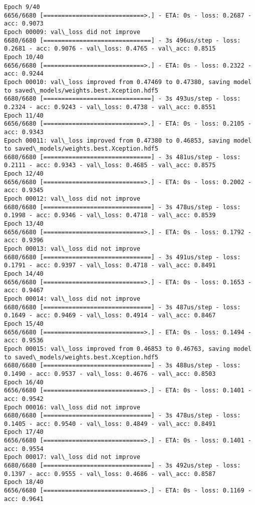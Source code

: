 \documentclass[11pt]{article}
\begin{document}
\begin{Verbatim}[commandchars=\\\{\}]
Epoch 9/40
6656/6680 [============================>.] - ETA: 0s - loss: 0.2687 - acc: 0.9073
Epoch 00009: val\_loss did not improve
6680/6680 [==============================] - 3s 496us/step - loss: 0.2681 - acc: 0.9076 - val\_loss: 0.4765 - val\_acc: 0.8515
Epoch 10/40
6656/6680 [============================>.] - ETA: 0s - loss: 0.2322 - acc: 0.9244
Epoch 00010: val\_loss improved from 0.47469 to 0.47380, saving model to saved\_models/weights.best.Xception.hdf5
6680/6680 [==============================] - 3s 493us/step - loss: 0.2324 - acc: 0.9243 - val\_loss: 0.4738 - val\_acc: 0.8551
Epoch 11/40
6656/6680 [============================>.] - ETA: 0s - loss: 0.2105 - acc: 0.9343
Epoch 00011: val\_loss improved from 0.47380 to 0.46853, saving model to saved\_models/weights.best.Xception.hdf5
6680/6680 [==============================] - 3s 481us/step - loss: 0.2111 - acc: 0.9343 - val\_loss: 0.4685 - val\_acc: 0.8575
Epoch 12/40
6656/6680 [============================>.] - ETA: 0s - loss: 0.2002 - acc: 0.9345
Epoch 00012: val\_loss did not improve
6680/6680 [==============================] - 3s 478us/step - loss: 0.1998 - acc: 0.9346 - val\_loss: 0.4718 - val\_acc: 0.8539
Epoch 13/40
6656/6680 [============================>.] - ETA: 0s - loss: 0.1792 - acc: 0.9396
Epoch 00013: val\_loss did not improve
6680/6680 [==============================] - 3s 491us/step - loss: 0.1791 - acc: 0.9397 - val\_loss: 0.4718 - val\_acc: 0.8491
Epoch 14/40
6656/6680 [============================>.] - ETA: 0s - loss: 0.1653 - acc: 0.9467
Epoch 00014: val\_loss did not improve
6680/6680 [==============================] - 3s 487us/step - loss: 0.1649 - acc: 0.9469 - val\_loss: 0.4914 - val\_acc: 0.8467
Epoch 15/40
6656/6680 [============================>.] - ETA: 0s - loss: 0.1494 - acc: 0.9536
Epoch 00015: val\_loss improved from 0.46853 to 0.46763, saving model to saved\_models/weights.best.Xception.hdf5
6680/6680 [==============================] - 3s 488us/step - loss: 0.1490 - acc: 0.9537 - val\_loss: 0.4676 - val\_acc: 0.8503
Epoch 16/40
6656/6680 [============================>.] - ETA: 0s - loss: 0.1401 - acc: 0.9542
Epoch 00016: val\_loss did not improve
6680/6680 [==============================] - 3s 478us/step - loss: 0.1405 - acc: 0.9540 - val\_loss: 0.4849 - val\_acc: 0.8491
Epoch 17/40
6656/6680 [============================>.] - ETA: 0s - loss: 0.1401 - acc: 0.9554
Epoch 00017: val\_loss did not improve
6680/6680 [==============================] - 3s 492us/step - loss: 0.1397 - acc: 0.9555 - val\_loss: 0.4686 - val\_acc: 0.8587
Epoch 18/40
6656/6680 [============================>.] - ETA: 0s - loss: 0.1169 - acc: 0.9641

\end{Verbatim}
\end{document}
